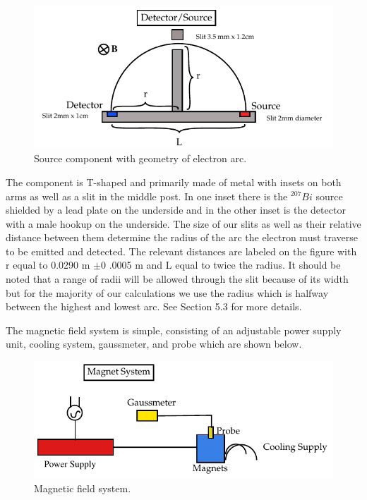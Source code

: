 \begin{figure}[H]
\begin{center}
\includegraphics[width=4 in]{REM-figures2.pdf}
\caption{Source component with geometry of electron arc.}
\end{center}
\end{figure}

The component is T-shaped and primarily made of metal with insets on both arms as well as a slit in the middle post.  In one inset there is the $^{207}Bi$ source shielded by a lead plate on the underside and in the other inset is the detector with a male hookup on the underside.  The size of our slits as well as their relative distance between them  determine the radius of the arc the electron must traverse to be emitted and detected. The relevant distances are labeled on the figure with r equal to 0.0290 m $\pm$0 .0005 m and L equal to twice the radius.  It should be noted that a range of radii will be allowed through the slit because of its width but for the majority of our calculations we use the radius which is halfway between the highest and lowest arc. See Section 5.3 for more details. 

The magnetic field system is simple, consisting of an adjustable power supply unit, cooling system, gaussmeter, and probe which are shown below. 

\begin{figure}[H]
\begin{center}
\includegraphics[width=4 in]{REM-figures3.pdf}
\caption{Magnetic field system.}
\end{center}
\end{figure}

